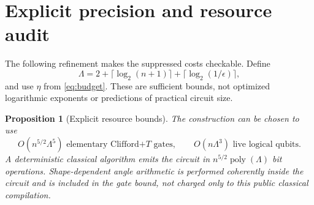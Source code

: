 \documentclass[11pt]{article}
\newtheorem{proposition}[theorem]{Proposition}
\theoremstyle{definition}
\newcommand{\poly}{\operatorname{poly}}
\begin{document}
\section{Explicit precision and resource audit}\label{sec:explicitcosts}

The following refinement makes the suppressed costs checkable. Define
\[
 \Lambda=2+\lceil\log_2(n+1)\rceil+\lceil\log_2(1/\epsilon)\rceil,
\]
and use $\eta$ from \eqref{eq:budget}. These are sufficient bounds, not
optimized logarithmic exponents or predictions of practical circuit size.

\begin{proposition}[Explicit resource bounds]\label{prop:explicit}
The construction can be chosen to use
\[
 O(n^{5/2}\Lambda^5)\text{ elementary Clifford+$T$ gates},\qquad
 O(n\Lambda^3)\text{ live logical qubits}.
\]
A deterministic classical algorithm emits the circuit in
$n^{5/2}\poly(\Lambda)$ bit operations. Shape-dependent angle arithmetic
is performed coherently inside the circuit and is included in the gate
bound, not charged only to this public classical compilation.
\end{proposition}
\end{document}
